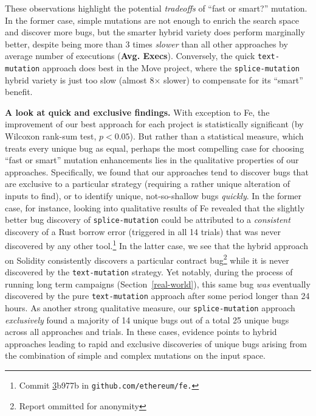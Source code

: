 \begin{sloppypar}
These observations highlight the potential \emph{tradeoffs} of ``fast or
smart?'' mutation. In the former case, simple mutations are not enough to
enrich the search space and discover more bugs, but the smarter hybrid variety
does perform marginally better, despite being more than 3 times \emph{slower}
than all other approaches by average number of executions (\textbf{Avg.
Execs}). Conversely, the quick \texttt{text-mutation} approach does best in the
Move project, where the \texttt{splice-mutation} hybrid variety is just too
slow (almost 8$\times$ slower) to compensate for its ``smart''
benefit.
\end{sloppypar}

\textbf{A look at quick and exclusive findings.} With exception to Fe, the
improvement of our best approach for each project is statistically significant
(by Wilcoxon rank-sum test, $p < 0.05$).  But rather than a statistical
measure, which treats every unique bug as equal, perhaps the most compelling
case for choosing ``fast or smart'' mutation enhancements lies in the
qualitative properties of our approaches. Specifically, we found that our
approaches tend to discover bugs that are exclusive to a particular strategy
(requiring a rather unique alteration of inputs to find), or to identify
unique, not-so-shallow bugs \emph{quickly}. In the former case, for instance,
looking into qualitative results of Fe revealed that the slightly better bug
discovery of \texttt{splice-mutation} could be attributed to a
\emph{consistent} discovery of a Rust borrow error (triggered in all 14 trials)
that was never discovered by any other tool.\footnote{Commit
\href{https://github.com/ethereum/fe/commit/3b977b3078eb163ba521f57d8509e16efdb9dbf4}
3b977b in \texttt{github.com/ethereum/fe.}} In the latter case, we see that the
hybrid approach on Solidity consistently discovers a particular contract
bug\footnote{Report ommitted for anonymity} while it is never discovered by the
\texttt{text-mutation} strategy. Yet notably, during the process of running
long term campaigns (Section~\ref{real-world}), this same bug \emph{was}
eventually discovered by the pure \texttt{text-mutation} approach after some
period longer than 24 hours. As another strong qualitative measure, our
\texttt{splice-mutation} approach \emph{exclusively} found a majority of 14
unique bugs out of a total 25 unique bugs across all approaches and trials.  In
these cases, evidence points to hybrid approaches leading to rapid and
exclusive discoveries of unique bugs arising from the combination of simple and
complex mutations on the input space.

